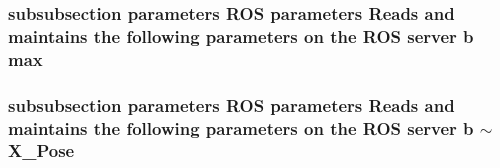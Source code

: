 \subsubsection[{\texorpdfstring{max}{max}}]{\setlength{\rightskip}{0pt plus 5cm}subsubsection parameters R\+OS parameters Reads and maintains the following parameters on the R\+OS server b max}\hypertarget{JacoPositionConfig_8dox_a55c9de72d9f3630abdf51bfe39c191dd}{}\label{JacoPositionConfig_8dox_a55c9de72d9f3630abdf51bfe39c191dd}
\subsubsection[{\texorpdfstring{$\sim$\+X\+\_\+\+Pose}{~X_Pose}}]{\setlength{\rightskip}{0pt plus 5cm}subsubsection parameters R\+OS parameters Reads and maintains the following parameters on the R\+OS server b $\sim$X\+\_\+\+Pose}\hypertarget{JacoPositionConfig_8dox_a9fff660751927d01485c1718209052c8}{}\label{JacoPositionConfig_8dox_a9fff660751927d01485c1718209052c8}
